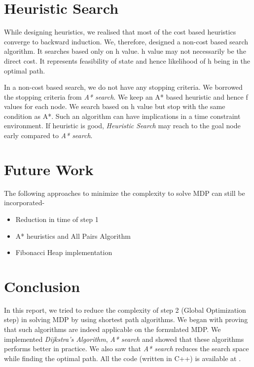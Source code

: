 \documentclass[a4paper,12pt]{article}
\begin{document}
\section{Heuristic Search}
While designing heuristics, we realised that most of the cost based heuristics converge to backward induction. We, therefore, designed a non-cost based search algorithm. It searches based only on h value. h value may not necessarily be the direct cost.
It represents feasibility of state and hence likelihood of h being in the optimal path.

In a non-cost based search, we do not have any stopping criteria. We borrowed the stopping criteria from \textit{A* search}. We keep an A* based heuristic and hence f values for each node. We search based on h value but stop with the same condition as A*. Such an algorithm can have implications in a time constraint environment. If heuristic is good, \textit{Heuristic Search} may reach to the goal node early compared to \textit{A* search}.

\section{Future Work}
The following approaches to minimize the complexity to solve MDP can still be incorporated-
\begin{itemize}
\item Reduction in time of step 1
\item A* heuristics and All Pairs Algorithm \cite{Cormen}
\item Fibonacci Heap implementation
\end{itemize}

\section{Conclusion}
In this report, we tried to reduce the complexity of step 2 (Global Optimization step) in solving MDP by using shortest path algorithms. We began with proving that such algorithms are indeed applicable on the formulated MDP. We implemented \textit{Dijkstra's Algorithm}, \textit{A* search} and showed that these algorithms performs better in practice. We also saw that \textit{A* search} reduces the search space while finding the optimal path. All the code (written in C++) is available at \cite{github}.



\end{document}
